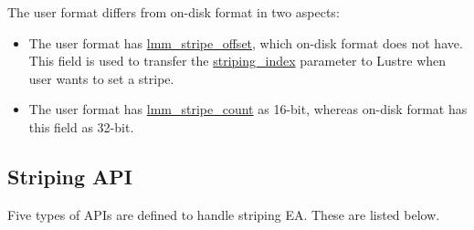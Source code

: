 The user format differs from on-disk format in two aspects: 

\begin{itemize}

\item The user format has \url{lmm_stripe_offset}, which on-disk format does
not have. This field is used to transfer the \url{striping_index} parameter to
Lustre when user wants to set a stripe.

\item The user format has \url{lmm_stripe_count} as 16-bit, whereas on-disk
format has this field as 32-bit.

\end{itemize}



\subsection{Striping API}
\label{sec:stripingapi}

Five types of APIs are defined to handle striping EA. These are listed below.


